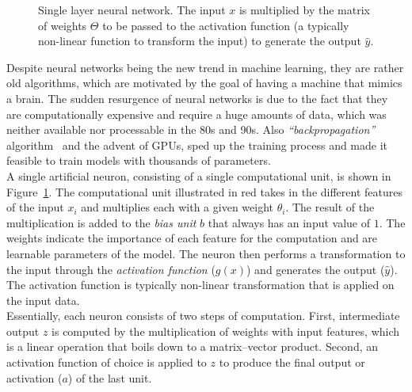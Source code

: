 \begin{figure}
\centering 
\resizebox{0.65\textwidth}{0.35\textwidth}{      

}
\caption{Single layer neural network. The input $x$ is multiplied by the matrix of weights $\Theta$ to be passed to the activation function (a typically non-linear function to transform the input) to generate the output $\hat { y }$. \protect \footnotemark}
\label{fig:preceptron}
\end{figure}
\noindent
Despite neural networks being the new trend in machine learning, they are rather old algorithms, which are motivated by the goal of having a machine that mimics a brain. The sudden resurgence of neural networks is due to the fact that they are computationally expensive and require a huge amounts of data, which was neither available nor processable in the 80s and 90s. Also \emph{``backpropagation''} algorithm~ and the advent of GPUs, sped up the training process and made it feasible to train models with thousands of parameters.\\
A single artificial neuron, consisting of a single computational unit, is shown in Figure~\ref{fig:preceptron}. The computational unit illustrated in red takes in the different features of the input $x_i$ and multiplies each with a given weight $\theta_i$. The result of the multiplication is added to the \emph{bias unit} $b$ that always has an input value of $1$.
The weights indicate the importance of each feature for the computation and are learnable parameters of the model. The neuron then performs a transformation to the input through the \emph{activation function} ($g(x)$) and generates the output ($\hat { y } $). The activation function is typically non-linear transformation that is applied on the input data.\\
Essentially, each neuron consists of two steps of computation. First, intermediate output $z$ is computed by the multiplication of weights with input features, which is a linear operation that boils down to a matrix--vector product.
Second, an activation function of choice is applied to $z$ to produce the final output or activation ($a$) of the last unit. \\
